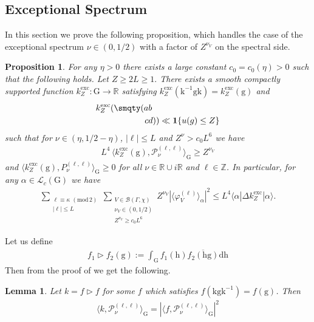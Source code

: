 \documentclass[12pt]{amsart}
\newtheorem{lemma}[theorem]{Lemma}
\newtheorem{proposition}[theorem]{Proposition}
\theoremstyle{definition}
\theoremstyle{remark}
\numberwithin{equation}{section}
\newcommand{\B}{\mathcal{B}}
\newcommand{\G}{\mathrm{G}}
\newcommand{\PP}{\mathcal{P}}
\newcommand{\R}{{\mathbb R}}
\newcommand{\Z}{{\mathbb Z}}
\newcommand{\1}{{\mathbf 1}}
\renewcommand{\k}{\mathrm{k}}
\newcommand{\g}{\mathrm{g}}
\newcommand{\h}{\mathrm{h}}
\renewcommand{\d}{\mathrm d}
\renewcommand{\pmod}[1]{\,\,(\mathrm{mod}\,{#1})}
\begin{document}
\subsection{Exceptional Spectrum}
In this section we prove the following proposition,  which handles the case of the exceptional spectrum $\nu \in (0,1/2)$ with a factor of $Z^{\nu_V}$ on the spectral side.
\begin{proposition} \label{prop:exceptionalboundbykernel}
For any $\eta > 0$ there exists a large constant $c_0= c_0(\eta)>0$ such that the following holds. Let $Z \geq 2 L \geq 1.$ There exists a smooth compactly supported function $k^{\mathrm{exc}}_Z:\G \to \R$ satisfying $k^{\mathrm{exc}}_Z(\mathrm{k}^{-1} \g \mathrm{k}) = k^{\mathrm{exc}}_Z(\g)$ and \begin{align}\label{eq:exkernk_zupper}
k^{\mathrm{exc}}_Z(\smqty(a& b \\ c & d)) \ll \mathbf{1}\{  u(g) \leq Z \}
 \end{align}
such that for $\nu \in (\eta,1/2-\eta)$, $|\ell| \leq L$ and $Z^{\nu} > c_0 L^6$ we have
 \begin{align*}
 L^4 \,  \langle   k^{\mathrm{exc}}_Z (\g),\PP_\nu^{(\ell,\ell)} \rangle_\G \geq Z^{\nu_V}
 \end{align*}
and $ \langle   k^{\mathrm{exc}}_Z(\g),P_\nu^{(\ell,\ell)} \rangle_\G  \geq 0$ for all $\nu \in \R \cup i \R$ and $\ell \in \Z$. In particular, for any $\alpha \in \mathcal{L}_c(\G)$ we have
\begin{align*}
     \sum_{\substack{ \ell \equiv \kappa \pmod{2} \\ |\ell| \leq L} }    \sum_{\substack{V \in \B(\Gamma,\chi)  \\ \nu_V \in (0,1/2) \\  Z^{\nu_V}\geq c_0 L^6 }} Z^{\nu_V} | \langle\varphi_V^{(\ell)}\rangle_{\alpha} |^2 \leq L^4 \langle \alpha |\Delta k^{\mathrm{exc}}_{Z} 
 | \alpha \rangle.
\end{align*}
\end{proposition}

Let us define
\begin{align*}
     f_1 \rhd f_2 (\g) := \int_\G f_1(\h ) \overline{f_2 (\h \g )} \d \h
\end{align*}
Then from the proof of \cite[Lemma 6.4]{GM} we get the following.
\begin{lemma} \label{le:convosquare}
   Let $k = f \rhd f$ for some $f$ which satisfies $f(\k \g \k^{-1})= f (\g)$. Then
   \begin{align*}
        \langle k, \PP_\nu^{(\ell,\ell)} \rangle_\G =  |\langle f, \PP_\nu^{(\ell,\ell)} \rangle_\G |^2
   \end{align*}
\end{lemma}
\end{document}
